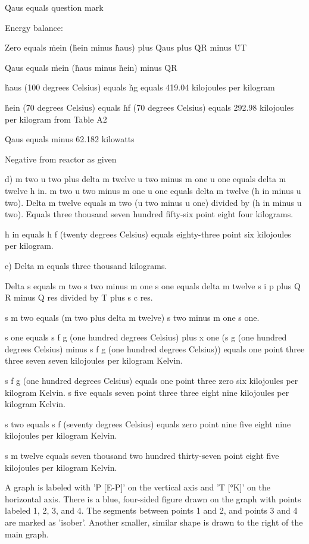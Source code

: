 Q̇aus equals question mark

Energy balance:

Zero equals ṁein (ḣein minus ḣaus) plus Q̇aus plus Q̇R minus U̇T

Q̇aus equals ṁein (ḣaus minus ḣein) minus Q̇R

ḣaus (100 degrees Celsius) equals ḣg equals 419.04 kilojoules per kilogram

ḣein (70 degrees Celsius) equals ḣf (70 degrees Celsius) equals 292.98 kilojoules per kilogram from Table A2

Q̇aus equals minus 62.182 kilowatts

Negative from reactor as given

d) m two u two plus delta m twelve u two minus m one u one equals delta m twelve h in. m two u two minus m one u one equals delta m twelve (h in minus u two). Delta m twelve equals m two (u two minus u one) divided by (h in minus u two). Equals three thousand seven hundred fifty-six point eight four kilograms.

h in equals h f (twenty degrees Celsius) equals eighty-three point six kilojoules per kilogram.

e) Delta m equals three thousand kilograms.

Delta s equals m two s two minus m one s one equals delta m twelve s i p plus Q R minus Q res divided by T plus s c res.

s m two equals (m two plus delta m twelve) s two minus m one s one.

s one equals s f g (one hundred degrees Celsius) plus x one (s g (one hundred degrees Celsius) minus s f g (one hundred degrees Celsius)) equals one point three three seven seven kilojoules per kilogram Kelvin.

s f g (one hundred degrees Celsius) equals one point three zero six kilojoules per kilogram Kelvin. s five equals seven point three three eight nine kilojoules per kilogram Kelvin.

s two equals s f (seventy degrees Celsius) equals zero point nine five eight nine kilojoules per kilogram Kelvin.

s m twelve equals seven thousand two hundred thirty-seven point eight five kilojoules per kilogram Kelvin.

A graph is labeled with 'P [E-P]' on the vertical axis and 'T [°K]' on the horizontal axis. There is a blue, four-sided figure drawn on the graph with points labeled 1, 2, 3, and 4. The segments between points 1 and 2, and points 3 and 4 are marked as 'isober'. Another smaller, similar shape is drawn to the right of the main graph.